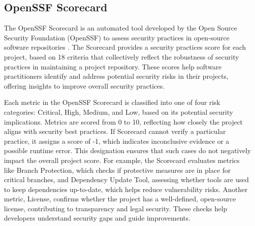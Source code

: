 


\subsection{OpenSSF Scorecard}
The OpenSSF Scorecard is an automated tool developed by the Open Source Security Foundation (OpenSSF) to assess security practices in open-source software repositories \cite{OpenSSF:online}. The Scorecard provides a security practices score for each project, based on 18 criteria that collectively reflect the robustness of security practices in maintaining a project repository. These scores help software practitioners identify and address potential security risks in their projects, offering insights to improve overall security practices. 


Each metric in the OpenSSF Scorecard is classified into one of four risk categories: Critical, High, Medium, and Low, based on its potential security implications. Metrics are scored from 0 to 10, reflecting how closely the project aligns with security best practices. If Scorecard cannot verify a particular practice, it assigns a score of -1, which indicates inconclusive evidence or a possible runtime error. This designation ensures that such cases do not negatively impact the overall project score. For example, the Scorecard evaluates metrics like Branch Protection, which checks if protective measures are in place for critical branches, and Dependency Update Tool, assessing whether tools are used to keep dependencies up-to-date, which helps reduce vulnerability risks. Another metric, License, confirms whether the project has a well-defined, open-source license, contributing to transparency and legal security. These checks help developers understand security gaps and guide improvements.

